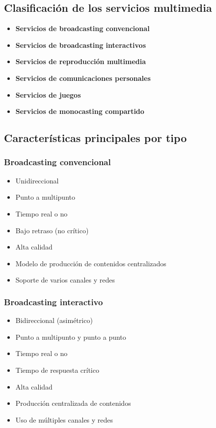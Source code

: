 \documentclass[11pt,a4paper]{article}
\begin{document}
\subsection{Clasificación de los servicios multimedia}
\begin{itemize}[leftmargin=1.5em]
  \item \textbf{Servicios de broadcasting convencional}
  \item \textbf{Servicios de broadcasting interactivos}
  \item \textbf{Servicios de reproducción multimedia}
  \item \textbf{Servicios de comunicaciones personales}
  \item \textbf{Servicios de juegos}
  \item \textbf{Servicios de monocasting compartido}
\end{itemize}

\subsection{Características principales por tipo}

\subsubsection*{Broadcasting convencional}
\begin{itemize}
  \item Unidireccional
  \item Punto a multipunto
  \item Tiempo real o no
  \item Bajo retraso (no crítico)
  \item Alta calidad
  \item Modelo de producción de contenidos centralizados
  \item Soporte de varios canales y redes
\end{itemize}

\subsubsection*{Broadcasting interactivo}
\begin{itemize}
  \item Bidireccional (asimétrico)
  \item Punto a multipunto y punto a punto
  \item Tiempo real o no
  \item Tiempo de respuesta crítico
  \item Alta calidad
  \item Producción centralizada de contenidos
  \item Uso de múltiples canales y redes
\end{itemize}
\end{document}
